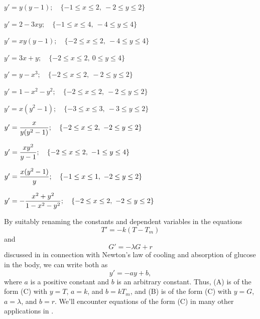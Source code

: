 \begin{exerciselist}
\item\label{exer:1.3.12}\CGex
$y'=y(y-1);    \quad  \{-1\le x\le 2,\ -2\le y\le2\}$

\item\label{exer:1.3.13}\CGex
$y'=2-3xy;    \quad  \{-1\le x\le 4,\ -4\le y\le4\}$

\item\label{exer:1.3.14}\CGex
$y'=xy(y-1);    \quad  \{-2\le x\le2,\ -4\le y\le 4\}$

\item\label{exer:1.3.15}\CGex
$y'=3x+y;    \quad  \{-2\le x\le2,\ 0\le y\le 4\}$

\item\label{exer:1.3.16}\CGex
$y'=y-x^3;    \quad  \{-2\le x\le2,\ -2\le y\le 2\}$

\item\label{exer:1.3.17}\CGex
$y'=1-x^2-y^2;    \quad  \{-2\le x\le2,\ -2\le y\le 2\}$

\item\label{exer:1.3.18}\CGex
$y'=x(y^2-1);    \quad  \{-3\le x\le3,\ -3\le y\le 2\}$

\item\label{exer:1.3.19}\CGex
$y'=\displaystyle\frac{x}{y(y^2-1)};    \quad  \{-2\le x\le2,\ -2\le y\le 2\}$

\item\label{exer:1.3.20}\CGex
$y'=\dst\frac{xy^2}{y-1};    \quad  \{-2\le x\le2,\ -1\le y\le 4\}$

\item\label{exer:1.3.21}\CGex
$y'=\displaystyle\frac{x(y^2-1)}{y};    \quad  \{-1\le x\le1,\ -2\le y\le 2\}$

\item\label{exer:1.3.22}\CGex
$y'=-\displaystyle\frac{x^2+y^2}{1-x^2-y^2};    \quad  \{-2\le x\le2,\ -2\le y\le 2\}$


\item\label{exer:1.3.23}\Lex
By suitably renaming the constants and  dependent variables
in the equations
\[
T' = -k(T-T_m)\tag{A}
\]
and
\[
G'=-\lambda G+r\tag{B}
\]
discussed in  in connection with Newton's
law of cooling and absorption of glucose in the body, we can
write both as
\[
y'=- ay+b,\tag{C}
\]
where $a$ is a positive constant and $b$ is an arbitrary
constant. Thus, (A) is of the form (C) with $y=T$, $a=k$, and
$b=kT_m$, and (B) is of the form (C) with $y=G$,
$a=\lambda$, and $b=r$. We'll encounter equations of the form
(C) in many other applications in .


\end{exerciselist}
